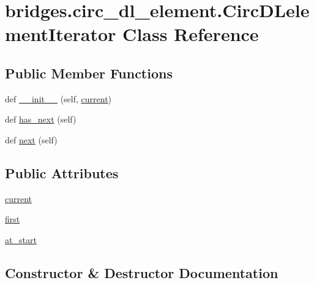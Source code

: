 \hypertarget{classbridges_1_1circ__dl__element_1_1_circ_d_lelement_iterator}{}\section{bridges.\+circ\+\_\+dl\+\_\+element.\+Circ\+D\+Lelement\+Iterator Class Reference}
\label{classbridges_1_1circ__dl__element_1_1_circ_d_lelement_iterator}
\subsection*{Public Member Functions}
\begin{DoxyCompactItemize}
\item 
def \hyperlink{classbridges_1_1circ__dl__element_1_1_circ_d_lelement_iterator_ac8fef9a4b81ea97524822d708cdebf9e}{\+\_\+\+\_\+init\+\_\+\+\_\+} (self, \hyperlink{classbridges_1_1circ__dl__element_1_1_circ_d_lelement_iterator_ae4497580816d9417eb0ef23fca9c7e67}{current})
\item 
def \hyperlink{classbridges_1_1circ__dl__element_1_1_circ_d_lelement_iterator_abe80ff701845ed71eeab5b8c2cc649d4}{has\+\_\+next} (self)
\item 
def \hyperlink{classbridges_1_1circ__dl__element_1_1_circ_d_lelement_iterator_a0ed033a941dd0fe3ea580118ec2bd32d}{next} (self)
\end{DoxyCompactItemize}
\subsection*{Public Attributes}
\begin{DoxyCompactItemize}
\item 
\hyperlink{classbridges_1_1circ__dl__element_1_1_circ_d_lelement_iterator_ae4497580816d9417eb0ef23fca9c7e67}{current}
\item 
\hyperlink{classbridges_1_1circ__dl__element_1_1_circ_d_lelement_iterator_a417297bff47b90d3f0dbef1eb7086791}{first}
\item 
\hyperlink{classbridges_1_1circ__dl__element_1_1_circ_d_lelement_iterator_a5f29d91b0111674b5fecec20bce74e9b}{at\+\_\+start}
\end{DoxyCompactItemize}


\subsection{Constructor \& Destructor Documentation}
\mbox{\label{classbridges_1_1circ__dl__element_1_1_circ_d_lelement_iterator_ac8fef9a4b81ea97524822d708cdebf9e}} 
